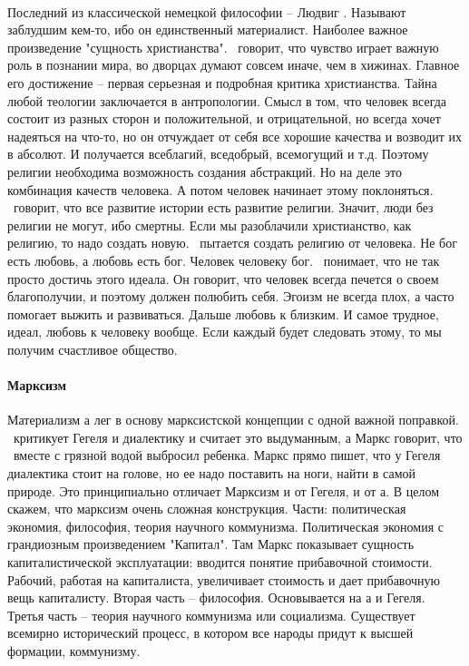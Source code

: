 \documentclass[a4paper, 12pt]{article}
\begin{document}
\paragraph{\fierbah}
Последний из классической немецкой философии -- Людвиг \fierbah. Называют заблудшим кем-то, ибо он единственный материалист. Наиболее важное произведение "сущность христианства". \fierbah\ говорит, что чувство играет важную роль в познании мира, во дворцах думают совсем иначе, чем в хижинах. Главное его достижение -- первая серьезная и подробная критика христианства. Тайна любой теологии заключается в антропологии. Смысл в том, что человек всегда состоит из разных сторон и положительной, и отрицательной, но всегда хочет надеяться на что-то, но он  отчуждает от себя все хорошие качества и возводит их в абсолют. И получается всеблагий, вседобрый, всемогущий и т.д. Поэтому религии необходима возможность создания абстракций. Но на деле это комбинация качеств человека. А потом человек начинает этому поклоняться. \fierbah\ говорит, что все развитие истории есть развитие религии. Значит, люди без религии не могут, ибо смертны. Если мы разоблачили христианство, как религию, то надо создать новую. \fierbah\ пытается создать религию от человека. Не бог есть любовь, а любовь есть бог. Человек человеку бог. \fierbah\ понимает, что не так просто достичь этого идеала. Он говорит, что человек всегда печется о своем благополучии, и поэтому должен полюбить себя. Эгоизм не всегда плох, а часто помогает выжить и развиваться. Дальше любовь к близким. И самое трудное, идеал, любовь к человеку вообще. Если каждый будет следовать этому, то мы получим счастливое общество. 

\paragraph{Марксизм}Материализм \fierbah а лег в основу марксистской концепции с одной важной поправкой. \fierbah\ критикует Гегеля и диалектику и считает это выдуманным, а Маркс говорит, что \fierbah\ вместе с грязной водой выбросил ребенка. Маркс прямо пишет, что у Гегеля диалектика стоит на голове, но ее надо поставить на ноги, найти в самой природе. Это принципиально отличает Марксизм и от Гегеля, и от \fierbah а. В целом скажем, что марксизм очень сложная конструкция. Части: политическая экономия, философия, теория научного коммунизма. Политическая экономия с грандиозным произведением "Капитал". Там Маркс показывает сущность капиталистической эксплуатации: вводится понятие прибавочной стоимости. Рабочий, работая на капиталиста, увеличивает стоимость и дает прибавочную вещь капиталисту. Вторая часть -- философия. Основывается на \fierbah а и Гегеля. Третья часть -- теория научного коммунизма или социализма. Существует всемирно исторический процесс, в котором все народы придут к высшей формации, коммунизму. 
\end{document}

